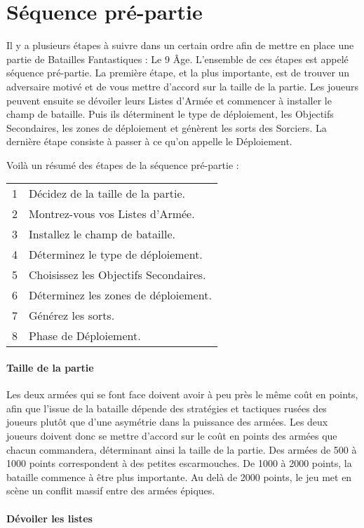 
\part{Séquence pré-partie}

Il y a plusieurs étapes à suivre dans un certain ordre afin de mettre en place une partie de Batailles Fantastiques : Le 9\ieme{} Âge. L'ensemble de ces étapes est appelé séquence pré-partie. La première étape, et la plus importante, est de trouver un adversaire motivé et de vous mettre d'accord sur la taille de la partie. Les joueurs peuvent ensuite se dévoiler leurs Listes d'Armée et commencer à installer le champ de bataille. Puis ils déterminent le type de déploiement, les Objectifs Secondaires, les zones de déploiement et génèrent les sorts des Sorciers. La dernière étape consiste à passer à ce qu'on appelle le Déploiement.

Voilà un résumé des étapes de la séquence pré-partie :

\hspace*{0.3cm}
\begin{tabular}{c|l}
1 & Décidez de la taille de la partie. \tabularnewline
2 & Montrez-vous vos Listes d'Armée. \tabularnewline
3 & Installez le champ de bataille. \tabularnewline
4 & Déterminez le type de déploiement. \tabularnewline
5 & Choisissez les Objectifs Secondaires. \tabularnewline
6 & Déterminez les zones de déploiement. \tabularnewline
7 & Générez les sorts. \tabularnewline
8 & Phase de Déploiement. \tabularnewline
\end{tabular}

\subsection{Taille de la partie}

Les deux armées qui se font face doivent avoir à peu près le même coût en points, afin que l'issue de la bataille dépende des stratégies et tactiques rusées des joueurs plutôt que d'une asymétrie dans la puissance des armées. Les deux joueurs doivent donc se mettre d'accord sur le coût en points des armées que chacun commandera, déterminant ainsi la taille de la partie. Des armées de 500 à 1000 points correspondent à des petites escarmouches. De 1000 à 2000 points, la bataille commence à être plus importante. Au delà de 2000 points, le jeu met en scène un conflit massif entre des armées épiques.

\subsection{Dévoiler les listes}

